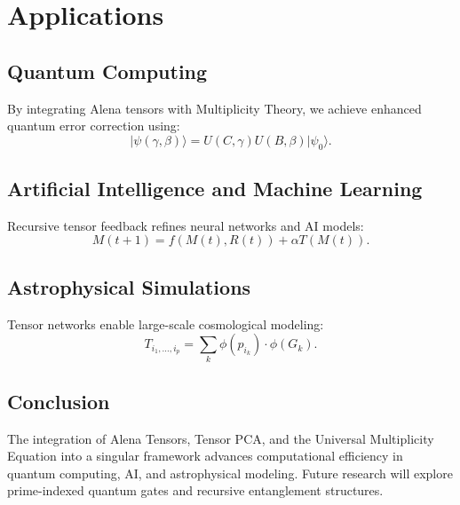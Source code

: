 \documentclass{article}
\theoremstyle{plain}
\begin{document}
\section{Applications}
\subsection{Quantum Computing}
By integrating Alena tensors with Multiplicity Theory, we achieve enhanced quantum error correction using:
\begin{equation}
|\psi(\gamma, \beta)\rangle = U(C, \gamma)U(B, \beta)|\psi_0\rangle.
\end{equation}

\subsection{Artificial Intelligence and Machine Learning}
Recursive tensor feedback refines neural networks and AI models:
\begin{equation}
M(t+1) = f(M(t), R(t)) + \alpha T(M(t)).
\end{equation}

\subsection{Astrophysical Simulations}
Tensor networks enable large-scale cosmological modeling:
\begin{equation}
T_{i_1,\dots,i_p} = \sum_{k} \phi(p_{i_k}) \cdot \phi(G_k).
\end{equation}

\subsection{Conclusion}
The integration of Alena Tensors, Tensor PCA, and the Universal Multiplicity Equation into a singular framework advances computational efficiency in quantum computing, AI, and astrophysical modeling. Future research will explore prime-indexed quantum gates and recursive entanglement structures.
\end{document}
